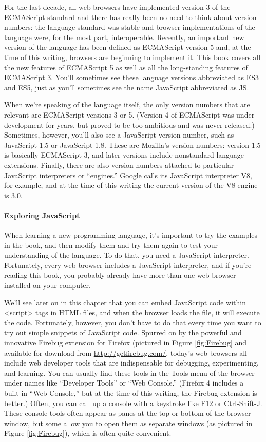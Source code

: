 For the last decade, all web browsers have implemented version 3 of the ECMAScript
standard and there has really been no need to think about version numbers: the language
standard was stable and browser implementations of the language were, for the
most part, interoperable. Recently, an important new version of the language has been
defined as ECMAScript version 5 and, at the time of this writing, browsers are beginning
to implement it. This book covers all the new features of ECMAScript 5 as well as all
the long-standing features of ECMAScript 3. You’ll sometimes see these language versions
abbreviated as ES3 and ES5, just as you’ll sometimes see the name JavaScript
abbreviated as JS.


When we’re speaking of the language itself, the only version numbers that are relevant
are ECMAScript versions 3 or 5. (Version 4 of ECMAScript was under development
for years, but proved to be too ambitious and was never released.) Sometimes, however,
you’ll also see a JavaScript version number, such as JavaScript 1.5 or JavaScript 1.8.
These are Mozilla’s version numbers: version 1.5 is basically ECMAScript 3, and later
versions include nonstandard language extensions. Finally, there are
also version numbers attached to particular JavaScript interpreters or “engines.” Google
calls its JavaScript interpreter V8, for example, and at the time of this writing the
current version of the V8 engine is 3.0.


\paragraph*{Exploring JavaScript}
\hfill \break
When learning a new programming language, it’s important to try the examples in the
book, and then modify them and try them again to test your understanding of the
language. To do that, you need a JavaScript interpreter. Fortunately, every web browser
includes a JavaScript interpreter, and if you’re reading this book, you probably already
have more than one web browser installed on your computer.

We’ll see later on in this chapter that you can embed JavaScript code within <script>
tags in HTML files, and when the browser loads the file, it will execute the code. Fortunately,
however, you don’t have to do that every time you want to try out simple
snippets of JavaScript code. Spurred on by the powerful and innovative Firebug extension
for Firefox (pictured in Figure \ref{fig:Firebug} and available for download from \href{http://getfirebug.com/}{http://getfirebug.com/}, today’s web browsers all include web developer tools that are indispensable for
debugging, experimenting, and learning. You can usually find these tools in the Tools
menu of the browser under names like “Developer Tools” or “Web Console.”
(Firefox 4 includes a built-in “Web Console,” but at the time of this writing, the Firebug
extension is better.) Often, you can call up a console with a keystroke like F12 or Ctrl-Shift-J.
These console tools often appear as panes at the top or bottom of the browser
window, but some allow you to open them as separate windows (as pictured in Figure
\ref{fig:Firebug}), which is often quite convenient.


